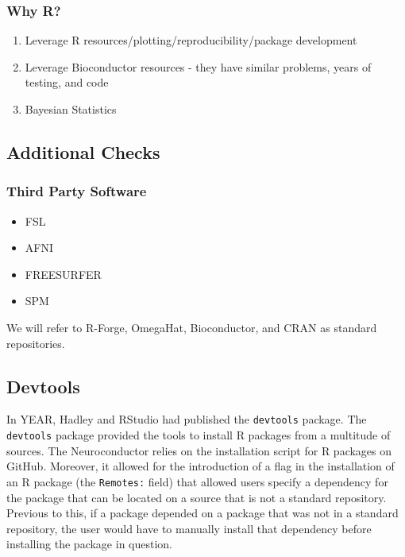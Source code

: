 \documentclass[]{elsarticle} %
\providecommand{\tightlist}{%
  \setlength{\itemsep}{0pt}\setlength{\parskip}{0pt}}
\begin{document}
\subsubsection{Why R?}\label{why-r}

\begin{enumerate}
\def\labelenumi{\arabic{enumi}.}
\setcounter{enumi}{2}
\tightlist
\item
  Leverage R resources/plotting/reproducibility/package development
\item
  Leverage Bioconductor resources - they have similar problems, years of
  testing, and code
\item
  Bayesian Statistics
\end{enumerate}

\subsection{Additional Checks}\label{additional-checks}

\subsubsection{Third Party Software}\label{third-party-software}

\begin{itemize}
\tightlist
\item
  FSL
\item
  AFNI
\item
  FREESURFER
\item
  SPM
\end{itemize}

We will refer to R-Forge, OmegaHat, Bioconductor, and CRAN as standard
repositories.

\subsection{Devtools}\label{devtools}

In YEAR, Hadley and RStudio had published the \texttt{devtools} package.
The \texttt{devtools} package provided the tools to install R packages
from a multitude of sources. The Neuroconductor relies on the
installation script for R packages on GitHub. Moreover, it allowed for
the introduction of a flag in the installation of an R package (the
\texttt{Remotes:} field) that allowed users specify a dependency for the
package that can be located on a source that is not a standard
repository. Previous to this, if a package depended on a package that
was not in a standard repository, the user would have to manually
install that dependency before installing the package in question.
\end{document}
